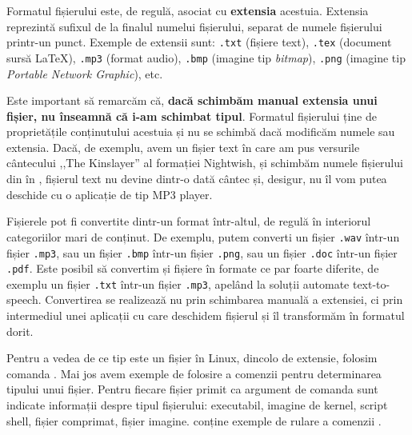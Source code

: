 Formatul fișierului este, de regulă, asociat cu \textbf{extensia} acestuia.
Extensia reprezintă sufixul de la finalul numelui fișierului, separat de numele fișierului printr-un punct.
Exemple de extensii sunt: \texttt{.txt} (fișiere text), \texttt{.tex} (document sursă LaTeX), \texttt{.mp3} (format audio), \texttt{.bmp} (imagine tip \textit{bitmap}), \texttt{.png} (imagine tip \textit{Portable Network Graphic}), etc.

Este important să remarcăm că, \textbf{dacă schimbăm manual extensia unui fișier, nu înseamnă că i-am schimbat tipul}.
Formatul fișierului ține de proprietățile conținutului acestuia și nu se schimbă dacă modificăm numele sau extensia.
Dacă, de exemplu, avem un fișier text în care am pus versurile cântecului ,,The Kinslayer'' al formației Nightwish, și schimbăm numele fișierului din  în , fișierul text nu devine dintr-o dată cântec și, desigur, nu îl vom putea deschide cu o aplicație de tip MP3 player.

Fișierele pot fi convertite dintr-un format într-altul, de regulă în interiorul categoriilor mari de conținut.
De exemplu, putem converti un fișier \texttt{.wav} într-un fișier \texttt {.mp3}, sau un fișier \texttt{.bmp} într-un fișier \texttt{.png}, sau un fișier \texttt{.doc} într-un fișier \texttt{.pdf}.
Este posibil să convertim și fișiere în formate ce par foarte diferite, de exemplu un fișier \texttt{.txt} într-un fișier \texttt{.mp3}, apelând la soluții automate text-to-speech.
Convertirea se realizează nu prin schimbarea manuală a extensiei, ci prin intermediul unei aplicații cu care deschidem fișierul și îl transformăm în formatul dorit.

Pentru a vedea de ce tip este un fișier în Linux, dincolo de extensie, folosim comanda .
Mai jos avem exemple de folosire a comenzii  pentru determinarea tipului unui fișier.
Pentru fiecare fișier primit ca argument de comanda  sunt indicate informații despre tipul fișierului: executabil, imagine de kernel, script shell, fișier comprimat, fișier imagine.
 conține exemple de rulare a comenzii .


